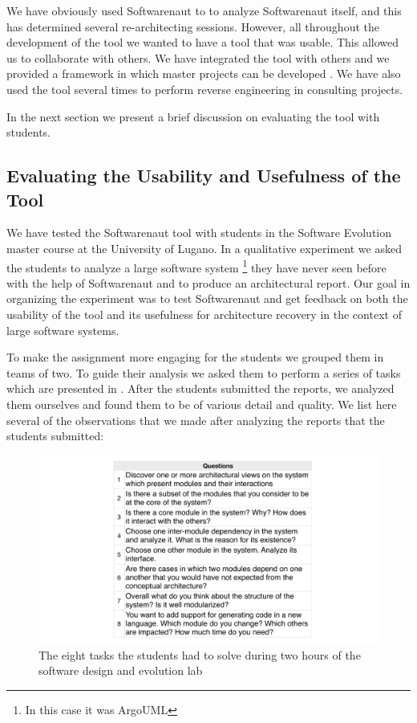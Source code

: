 \documentclass[preprint,12pt]{elsarticle}
\begin{document}
We have obviously used Softwarenaut to to analyze Softwarenaut itself, and this has determined several re-architecting sessions. However, all throughout the development of the tool we wanted to have a tool that was usable. This allowed us to collaborate with others. We have integrated the tool with others \cite{lungu-clust, lungu-scico, nier-story} and we provided a framework in which master projects can be developed \cite{boeckmann-mars}. We have also used the tool several times to perform reverse engineering in consulting projects.

In the next section we present a brief discussion on evaluating the tool with students.

\subsection {Evaluating the Usability and Usefulness of the Tool}
We have tested the Softwarenaut tool with students in the Software Evolution master course at the University of Lugano. In a qualitative experiment we asked the students to analyze a large software system \footnote{In this case it was ArgoUML} they have never seen before with the help of Softwarenaut and to produce an architectural report. Our goal in organizing the experiment was to test Softwarenaut and get feedback on both the usability of the tool and its usefulness for architecture recovery in the context of large software systems. 



To make the assignment more engaging for the students we grouped them in teams of two. To guide their analysis we asked them to perform a series of tasks which are presented in . After the students submitted the reports, we analyzed them ourselves and found them to be of various detail and quality. We list here several of the observations that we made after analyzing the reports that the students submitted:

\begin{figure}[t]
\begin{center}
\includegraphics[width=\linewidth]{tasks}
\caption{The eight tasks the students had to solve during two hours of the software design and evolution lab}
\end{center}
\end{figure}
\end{document}
